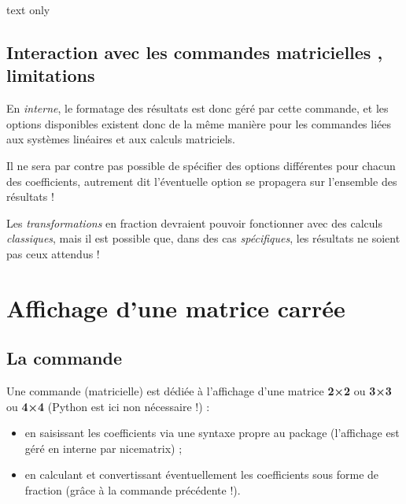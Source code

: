 \documentclass[french,a4paper,11pt]{article}
\begin{document}
\begin{PresentationCode}{text only}
\hfill{} \qquad
{} \qquad
{} \qquad
{} \qquad
{} \qquad
{}\hfill~
\end{PresentationCode}

\subsection{Interaction avec les commandes \og matricielles \fg, limitations}

\begin{warningblock}
En \textit{interne}, le formatage des résultats est donc géré par cette commande, et les options disponibles existent donc de la même manière pour les commandes liées aux systèmes linéaires et aux calculs matriciels.

\smallskip

Il ne sera par contre pas possible de spécifier des options différentes pour chacun des coefficients, autrement dit l'éventuelle option se propagera sur l'ensemble des résultats !

\smallskip

Les \textit{transformations} en fraction devraient pouvoir fonctionner avec des calculs \textit{classiques}, mais il est possible que, dans des cas \textit{spécifiques}, les résultats ne soient pas ceux attendus !
\end{warningblock}

\pagebreak

\section{Affichage d'une matrice carrée}

\subsection{La commande}

\begin{cautionblock}
Une commande (matricielle) est dédiée à l'affichage d'une matrice \textbf{2×2} ou \textbf{3×3} ou \textbf{4×4} (\textsf{Python} est ici non nécessaire !) :

\begin{itemize}
	\item en saisissant les coefficients via une syntaxe propre au package (l'affichage est géré en interne par \textsf{nicematrix}) ;
	\item en calculant et convertissant éventuellement les coefficients sous forme de fraction (grâce à la commande précédente !).
\end{itemize}
\vspace*{-\baselineskip}\leavevmode
\end{cautionblock}
\end{document}
